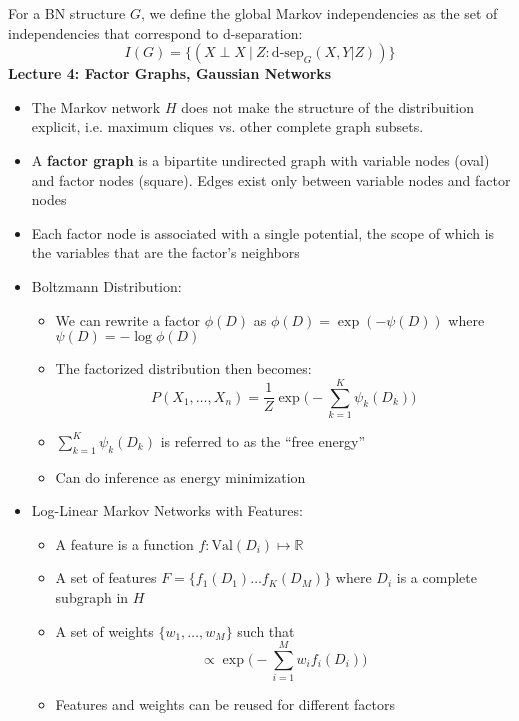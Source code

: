 \documentclass{article}
\begin{document}
For a BN structure $G$, we define the global Markov independencies as the set of independencies that correspond to d-separation: \begin{equation*}
    I(G) = \{(X \perp X\ |\ Z : \text{d-sep}_G(X, Y | Z))\}
\end{equation*}
\textbf{Lecture 4: Factor Graphs, Gaussian Networks}
\begin{itemize}
    \item The Markov network $H$ does not make the structure of the distribuition explicit, i.e. maximum cliques vs. other complete graph subsets. 
    \item A \textbf{factor graph} is a bipartite undirected graph with variable nodes (oval) and factor nodes (square). Edges exist only between variable nodes and factor nodes 
    \item Each factor node is associated with a single potential, the scope of which is the variables that are the factor's neighbors 
    \item Boltzmann Distribution: \begin{itemize}
        \item We can rewrite a factor $\phi(D)$ as $\phi(D) = \exp (-\psi(D))$ where $\psi(D) = - \log \phi(D)$
        \item The factorized distribution then becomes: \begin{equation*}
            P(X_1, \dots , X_n) = \frac{1}{Z}\exp \bigg( -\sum_{k = 1}^{K} \psi_k (D_k)\bigg)
        \end{equation*}
        \item $\sum_{k = 1}^{K}\psi_k(D_k)$ is referred to as the ``free energy''
        \item Can do inference as energy minimization
    \end{itemize}
    \item Log-Linear Markov Networks with Features: \begin{itemize}
        \item A feature is a function $f: \text{Val}(D_i) \mapsto \mathbb{R}$
        \item A set of features $F = \{f_1(D_1) \dots f_K(D_M)\}$ where $D_i$ is a complete subgraph in $H$
        \item A set of weights $\{w_1, \dots , w_M\}$ such that \begin{equation*}
            \propto \exp \bigg(- \sum_{i = 1}^{M}w_if_i(D_i) \bigg)
        \end{equation*}
        \item Features and weights can be reused for different factors 

\end{itemize}
\end{itemize}
\end{document}
